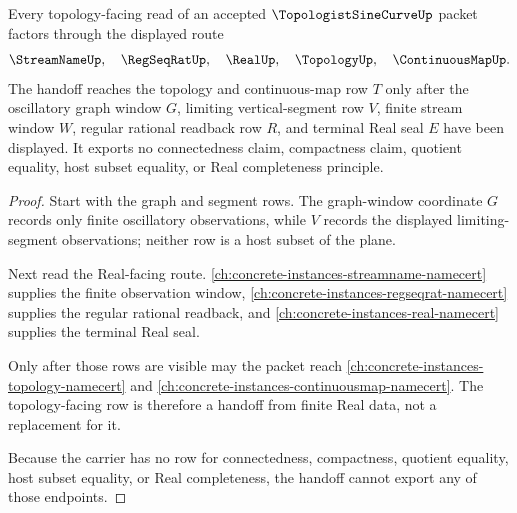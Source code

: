 \begin{theorem}
\label{thm:topologist-sine-curve-real-topology-handoff}
Every topology-facing read of an accepted $\TopologistSineCurveUp$ packet factors through the displayed route
$$
\StreamNameUp,\quad \RegSeqRatUp,\quad \RealUp,\quad \TopologyUp,\quad \ContinuousMapUp .
$$
The handoff reaches the topology and continuous-map row $T$ only after the oscillatory graph window $G$, limiting vertical-segment row $V$, finite stream window $W$, regular rational readback row $R$, and terminal Real seal $E$ have been displayed. It exports no connectedness claim, compactness claim, quotient equality, host subset equality, or Real completeness principle.
\end{theorem}
\begin{proof}
Start with the graph and segment rows. The graph-window coordinate $G$ records only finite oscillatory observations, while $V$ records the displayed limiting-segment observations; neither row is a host subset of the plane.

Next read the Real-facing route. \autoref{ch:concrete-instances-streamname-namecert} supplies the finite observation window, \autoref{ch:concrete-instances-regseqrat-namecert} supplies the regular rational readback, and \autoref{ch:concrete-instances-real-namecert} supplies the terminal Real seal.

Only after those rows are visible may the packet reach \autoref{ch:concrete-instances-topology-namecert} and \autoref{ch:concrete-instances-continuousmap-namecert}. The topology-facing row is therefore a handoff from finite Real data, not a replacement for it.

Because the carrier has no row for connectedness, compactness, quotient equality, host subset equality, or Real completeness, the handoff cannot export any of those endpoints.
\end{proof}




